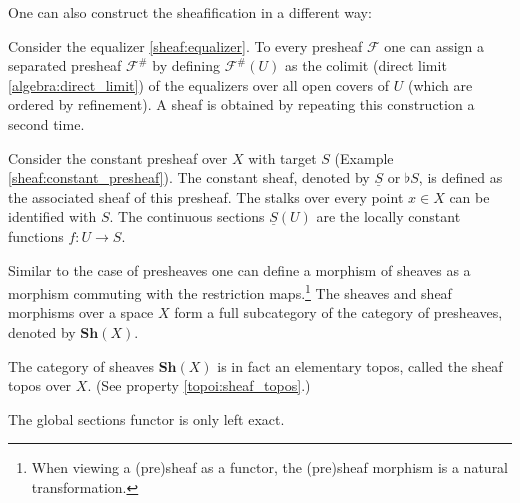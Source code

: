     One can also construct the sheafification in a different way:
    \begin{construct}\label{sheaf:colimit_construction}
        Consider the equalizer \ref{sheaf:equalizer}. To every presheaf $\mathcal{F}$ one can assign a separated presheaf $\mathcal{F}^\#$ by defining $\mathcal{F}^\#(U)$ as the colimit (direct limit \ref{algebra:direct_limit}) of the equalizers over all open covers of $U$ (which are ordered by refinement). A sheaf is obtained by repeating this construction a second time.
    \end{construct}

    \begin{example}\label{sheaf:constant_sheaf}
        Consider the constant presheaf over $X$ with target $S$ (Example \ref{sheaf:constant_presheaf}). The constant sheaf, denoted by $\underline{S}$ or $\flat S$, is defined as the associated sheaf of this presheaf. The stalks over every point $x\in X$ can be identified with $S$. The continuous sections $\underline{S}(U)$ are the locally constant functions $f:U\rightarrow S$.
    \end{example}

    \begin{notation}
        Similar to the case of presheaves one can define a morphism of sheaves as a morphism commuting with the restriction maps.\footnote{When viewing a (pre)sheaf as a functor, the (pre)sheaf morphism is a natural transformation.} The sheaves and sheaf morphisms over a space $X$ form a full subcategory of the category of presheaves, denoted by $\mathbf{Sh}(X)$.
    \end{notation}

    \begin{property}
        The category of sheaves $\mathbf{Sh}(X)$ is in fact an elementary topos, called the sheaf topos over $X$. (See property \ref{topoi:sheaf_topos}.)
    \end{property}

    \begin{property}\label{sheaf:left_exact_functor}
        The global sections functor is only left exact.
    \end{property}

